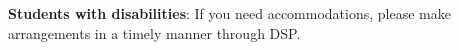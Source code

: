\documentclass[11pt]{article}
\begin{document}
\textbf{Students with disabilities}: If you need accommodations, please make
arrangements in a timely manner through DSP.\\

\end{document}
